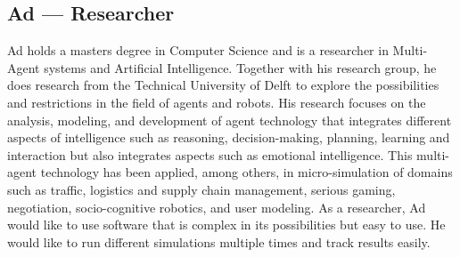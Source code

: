 \subsection{Ad –-- Researcher}
Ad holds a masters degree in Computer Science and is a researcher in Multi-Agent systems and Artificial Intelligence. Together with his research group, he does research from the Technical University of Delft to explore the possibilities and restrictions in the field of agents and robots. His research focuses on the analysis, modeling, and development of agent technology that integrates different aspects of intelligence such as reasoning, decision-making, planning, learning and interaction but also integrates aspects such as emotional intelligence. This multi-agent technology has been applied, among others, in micro-simulation of domains such as traffic, logistics and supply chain management, serious gaming, negotiation, socio-cognitive robotics, and user modeling. 
As a researcher, Ad would like to use software that is complex in its possibilities but easy to use. He would like to run different simulations multiple times and track results easily.
 